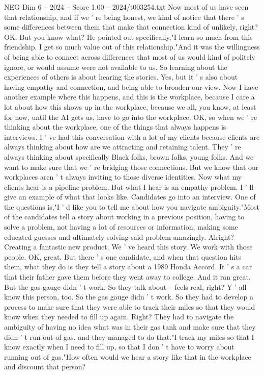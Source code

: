 \begin{textsample}{NEG Dim 6 – 2024 – Score 1.00 – 2024/t003254.txt}
Now most of us have seen that relationship, and if we ' re being honest, we kind of notice that there ' s some differences between them that make that connection kind of unlikely, right?
OK.
But you know what?
He pointed out specifically,"I learn so much from this friendship.
I get so much value out of this relationship."And it was the willingness of being able to connect across differences that most of us would kind of politely ignore, or would assume were not available to us.
So learning about the experiences of others is about hearing the stories.
Yes, but it ' s also about having empathy and connection, and being able to broaden our view.
Now I have another example where this happens, and this is the workplace, because I care a lot about how this shows up in the workplace, because we all, you know, at least for now, until the AI gets us, have to go into the workplace.
OK, so when we ' re thinking about the workplace, one of the things that always happens is interviews.
I ' ve had this conversation with a lot of my clients because clients are always thinking about how are we attracting and retaining talent.
They ' re always thinking about specifically Black folks, brown folks, young folks.
And we want to make sure that we ' re bridging those connections.
But we know that our workplaces aren ' t always inviting to those diverse identities.
Now what my clients hear is a pipeline problem.
But what I hear is an empathy problem.
I ' ll give an example of what that looks like.
Candidates go into an interview.
One of the questions is,"I ' d like you to tell me about how you navigate ambiguity."Most of the candidates tell a story about working in a previous position, having to solve a problem, not having a lot of resources or information, making some educated guesses and ultimately solving said problem amazingly.
Alright?
Creating a fantastic new product.
We ' ve heard this story.
We work with those people.
OK, great.
But there ' s one candidate, and when that question hits them, what they do is they tell a story about a 1989 Honda Accord.
It ' s a car that their father gave them before they went away to college.
And it ran great.
But the gas gauge didn ' t work.
So they talk about -- feels real, right?
Y ' all know this person, too.
So the gas gauge didn ' t work.
So they had to develop a process to make sure that they were able to track their miles so that they would know when they needed to fill up again.
Right?
They had to navigate the ambiguity of having no idea what was in their gas tank and make sure that they didn ' t run out of gas, and they managed to do that."I track my miles so that I know exactly when I need to fill up, so that I don ' t have to worry about running out of gas."How often would we hear a story like that in the workplace and discount that person?

\end{textsample}
